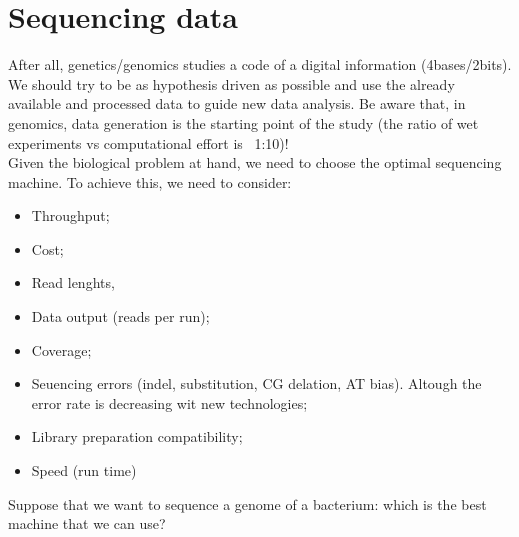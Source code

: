 \graphicspath{{chapters/images/04/}}
\chapter{Sequencing data}
After all, genetics/genomics studies a code of a digital information (4bases/2bits). We should try to be as hypothesis driven as possible and use the already available and processed data to guide new data analysis. Be aware that, in genomics, data generation is the starting point of the study (the ratio of wet experiments vs computational effort is ~1:10)!\\
Given the biological problem at hand, we need to choose the optimal sequencing machine. To achieve this, we need to consider:
\begin{itemize}
\item Throughput;
\item Cost;
\item Read lenghts, 
\item Data output (reads per run);
\item Coverage; 
\item Seuencing errors (indel, substitution, CG delation, AT bias). Altough the error rate is decreasing wit new technologies;
\item Library preparation compatibility;
\item Speed (run time)
\end{itemize}
Suppose that we want to sequence a genome of a bacterium: which is the best machine that we can use?

